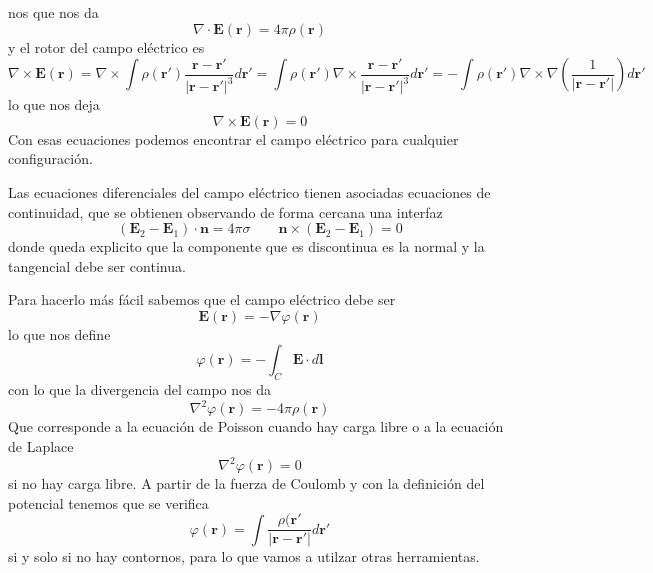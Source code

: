 \documentclass[a4paper]{article}
\numberwithin{equation}{section} %
\renewcommand{\vec}[1]{\boldsymbol{#1}}
\begin{document}
nos que nos da
\begin{equation}
\nabla \cdot \vec{E}(\vec{r}) = 4\pi \rho(\vec{r})
\label{eq:gauss_diff}
\end{equation}
y el rotor del campo eléctrico es
\[\nabla \times \vec{E}(\vec{r}) = \nabla \times \int \rho(\vec{r}') \frac{\vec{r} - \vec{r}'}{|\vec{r} - \vec{r}'|^3} d\vec{r}' = \int \rho(\vec{r}') \nabla \times \frac{\vec{r} - \vec{r}'}{|\vec{r} - \vec{r}'|^3} d\vec{r}' = - \int \rho(\vec{r}') \nabla \times \nabla \left(\frac{1}{|\vec{r} - \vec{r}'|}\right) d\vec{r}'\]
lo que nos deja
\begin{equation}
\nabla \times \vec{E}(\vec{r}) = 0
\label{eq:electroestatica_rotor}
\end{equation}
Con esas ecuaciones podemos encontrar el campo eléctrico para cualquier configuración.

Las ecuaciones diferenciales del campo eléctrico tienen asociadas ecuaciones de continuidad, que se obtienen observando de forma cercana una interfaz
\begin{equation}
 (\vec{E}_2 - \vec{E}_1) \cdot \vec{n} = 4 \pi \sigma \qquad \vec{n} \times (\vec{E}_2 - \vec{E}_1) = 0 
 \label{eq:electroestatica_continuidad_campo}
\end{equation}
donde queda explicito que la componente que es discontinua es la normal y la tangencial debe ser continua. 


Para hacerlo más fácil sabemos que el campo eléctrico debe ser
\begin{equation}
 \vec{E}(\vec{r}) = - \nabla \varphi(\vec{r})
 \label{eq:electroestatico_potencial}
\end{equation}
lo que nos define
\begin{equation}
 \varphi(\vec{r}) = - \int_C \vec{E} \cdot d\vec{l}
 \label{eq:electroestatico_potencial_integral}
\end{equation}
con lo que la divergencia del campo nos da
\begin{equation}
 \nabla^2 \varphi(\vec{r}) = - 4  \pi \rho(\vec{r})
 \label{eq:electroestatico_potencial_poisson}
\end{equation}
Que corresponde a la ecuación de Poisson cuando hay carga libre o a la ecuación de Laplace
\begin{equation}
 \nabla^2 \varphi(\vec{r}) = 0
 \label{eq:electroestatico_potencial_laplace}
 \end{equation}
 si no hay carga libre. A partir de la fuerza de Coulomb y con la definición del potencial tenemos que se verifica
\begin{equation}
	\varphi(\vec{r}) = \int \frac{\rho(\vec{r}'}{|\vec{r} - \vec{r}'|} d\vec{r}'
	\label{eq:electroestatica_potencial_superposicion_integral}
\end{equation}
si y solo si no hay contornos, para lo que vamos a utilzar otras herramientas.
\end{document}
